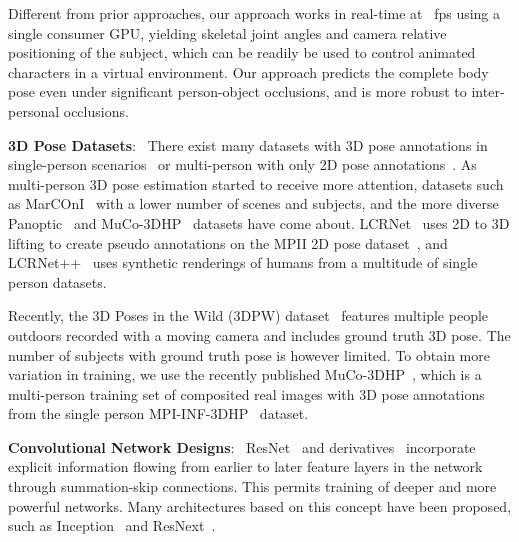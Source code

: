\documentclass[acmtog,authorversion]{acmart}
\newcommand{\parahead}[1]{\textbf{#1}:\ }
\begin{document}
Different from prior approaches, our approach works in real-time at ~fps using a single consumer GPU, yielding skeletal joint angles and camera relative positioning of the subject, which can be readily be used to control animated characters in a virtual environment.
Our approach predicts the complete body pose even under significant person-object occlusions, and is more robust to inter-personal occlusions. 

\parahead{3D Pose Datasets}
There exist many datasets with 3D pose annotations in single-person scenarios~\cite{ionescu_human36_pami14,sigal_humaneva_ijcv10,trumble2017total,vonPon2016a,mehta_mono_3dv17} or multi-person with only 2D pose annotations~\cite{andriluka_mpii2d_cvpr14,lin_coco_eccv14}. As multi-person 3D pose estimation started to receive more attention, datasets such as MarCOnI~\cite{elhayek_convmocap_TPAMI2016} with a lower number of scenes and subjects, and the more diverse Panoptic~\cite{jooICCV2015} and MuCo-3DHP~\cite{mehta_3dv18} datasets have come about. 
LCRNet~\cite{rogez_lcr_cvpr17} uses 2D to 3D lifting to create pseudo annotations on the MPII 2D pose dataset~\cite{andriluka_mpii2d_cvpr14}, and LCRNet++~\cite{rogez_lcrpp} uses synthetic renderings of humans from a multitude of single person datasets.

Recently, the 3D Poses in the Wild (3DPW) dataset~\cite{vonMarcard2018} features multiple people outdoors recorded with a moving camera and includes ground truth 3D pose. The number of subjects with ground truth pose is however limited. To obtain more variation in training, we use the recently published MuCo-3DHP~\cite{mehta_3dv18}, which is a multi-person training set of composited real images with 3D pose annotations from the single person MPI-INF-3DHP~ dataset. 



\parahead{Convolutional Network Designs} 
ResNet~\cite{he_resnet_cvpr2016} and derivatives~\cite{xie2017aggregated} incorporate explicit information flowing from earlier to later feature layers in the network through summation-skip connections. 
This permits training of deeper and more powerful networks.
Many architectures based on this concept have been proposed, such as Inception~\cite{szegedy2017inception} and ResNext~\cite{xie2017aggregated}. 
\end{document}
